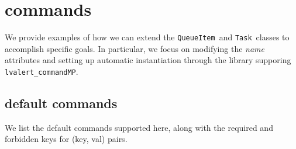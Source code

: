 \documentclass{article}
\newcommand{\lvalertCommandMP}{\texttt{lvalert\_commandMP}}
\newcommand{\QueueItem}{\texttt{QueueItem}}
\newcommand{\Task}{\texttt{Task}}
\begin{document}

\newpage 

\section{commands}
\label{sec: commands}

We provide examples of how we can extend the \QueueItem~and \Task~classes to accomplish specific goals. 
In particular, we focus on modifying the \textit{name} attributes and setting up automatic instantiation through the library supporing \lvalertCommandMP.


\subsection{default commands}
\label{sec: default commands}

We list the default commands supported here, along with the required and forbidden keys for (key, val) pairs.
\end{document}
